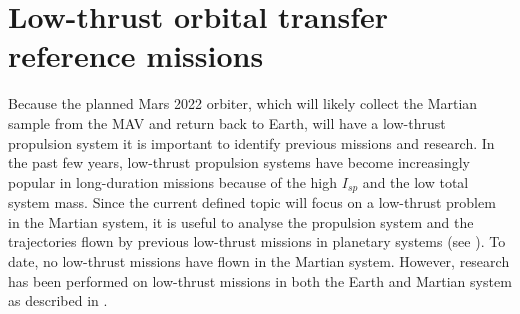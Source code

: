 








\section{Low-thrust orbital transfer reference missions}
\label{sec:lowthortrref}
Because the planned Mars 2022 orbiter, which will likely collect the Martian sample from the \ac{MAV} and return back to Earth, will have a low-thrust propulsion system it is important to identify previous missions and research. In the past few years, low-thrust propulsion systems have become increasingly popular in long-duration missions because of the high $I_{sp}$ and the low total system mass. Since the current defined topic will focus on a low-thrust problem in the Martian system, it is useful to analyse the propulsion system and the trajectories flown by previous low-thrust missions in planetary systems (see ). To date, no low-thrust missions have flown in the Martian system. However, research has been performed on low-thrust missions in both the Earth and Martian system as described in .


